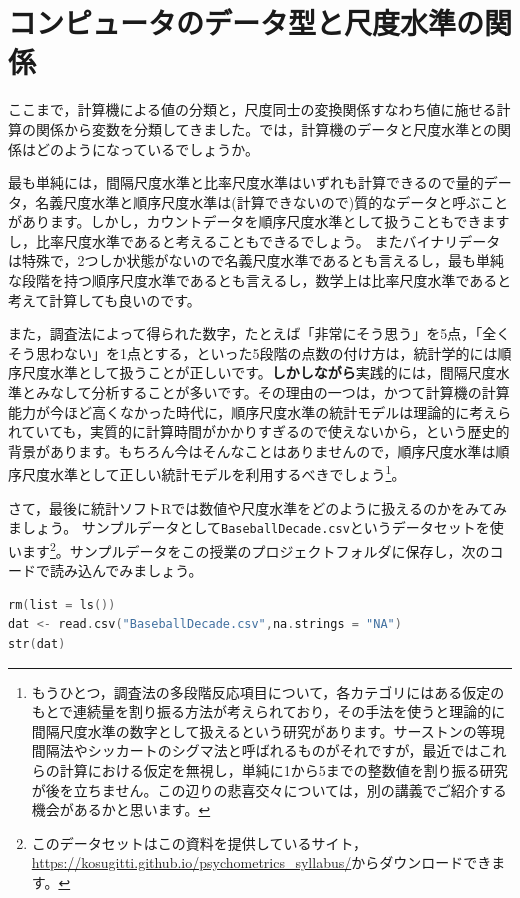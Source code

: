 \documentclass{ltjsbook}
\begin{document}
\section{コンピュータのデータ型と尺度水準の関係}
ここまで，計算機による値の分類と，尺度同士の変換関係すなわち値に施せる計算の関係から変数を分類してきました。では，計算機のデータと尺度水準との関係はどのようになっているでしょうか。

最も単純には，間隔尺度水準と比率尺度水準はいずれも計算できるので量的データ，名義尺度水準と順序尺度水準は(計算できないので)質的なデータと呼ぶことがあります。しかし，カウントデータを順序尺度水準として扱うこともできますし，比率尺度水準であると考えることもできるでしょう。
またバイナリデータは特殊で，2つしか状態がないので名義尺度水準であるとも言えるし，最も単純な段階を持つ順序尺度水準であるとも言えるし，数学上は比率尺度水準であると考えて計算しても良いのです。

また，調査法によって得られた数字，たとえば「非常にそう思う」を5点，「全くそう思わない」を1点とする，といった5段階の点数の付け方は，統計学的には順序尺度水準として扱うことが正しいです。\textbf{しかしながら}実践的には，間隔尺度水準とみなして分析することが多いです。その理由の一つは，かつて計算機の計算能力が今ほど高くなかった時代に，順序尺度水準の統計モデルは理論的に考えられていても，実質的に計算時間がかかりすぎるので使えないから，という歴史的背景があります。もちろん今はそんなことはありませんので，順序尺度水準は順序尺度水準として正しい統計モデルを利用するべきでしょう\footnote{もうひとつ，調査法の多段階反応項目について，各カテゴリにはある仮定のもとで連続量を割り振る方法が考えられており，その手法を使うと理論的に間隔尺度水準の数字として扱えるという研究があります。サーストンの等現間隔法やシッカートのシグマ法と呼ばれるものがそれですが，最近ではこれらの計算における仮定を無視し，単純に1から5までの整数値を割り振る研究が後を立ちません。この辺りの悲喜交々については，別の講義でご紹介する機会があるかと思います。}。

さて，最後に統計ソフトRでは数値や尺度水準をどのように扱えるのかをみてみましょう。
サンプルデータとして\verb|BaseballDecade.csv|というデータセットを使います\footnote{このデータセットはこの資料を提供しているサイト，\url{https://kosugitti.github.io/psychometrics_syllabus/}からダウンロードできます。}。サンプルデータをこの授業のプロジェクトフォルダに保存し，次のコードで読み込んでみましょう。

\begin{lstlisting}[language=c++,label={code:4_01},caption={データの読み込み}]
rm(list = ls())
dat <- read.csv("BaseballDecade.csv",na.strings = "NA")
str(dat)
\end{lstlisting}
\end{document}
